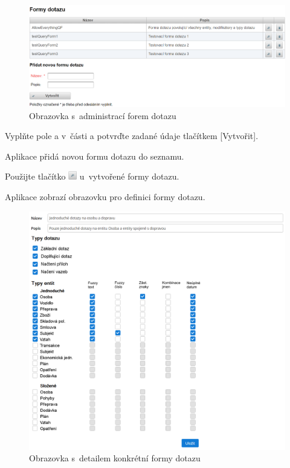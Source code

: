 \documentclass[thesis=M,czech]{FITthesis}[2019/12/23]
\begin{document}
\begin{figure}[H]
  \centering
  \includegraphics[width=\textwidth]{res/guide/QueryForms.png}
  \caption{Obrazovka s~administrací forem dotazu}
  \label{fig:Obrazovka s~administrací forem dotazu}
\end{figure}

Vyplňte pole  a  v~části  a potvrďte zadané údaje tlačítkem [Vytvořit].

Aplikace přidá novou formu dotazu do seznamu.

Použijte tlačítko \includegraphics[height=1em]{res/guide/SearchIcon.png} u~vytvořené formy dotazu.
 
Aplikace zobrazí obrazovku pro definici formy dotazu.

\begin{figure}[H]
  \centering
  \includegraphics[width=\textwidth]{res/guide/QueryFormDetail.png}
  \caption{Obrazovka s~detailem konkrétní formy dotazu}
  \label{fig:Obrazovka s~detailem konkrétní formy dotazu}
\end{figure}
\end{document}
